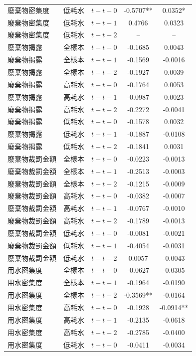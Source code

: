 \documentclass[12pt,a4paper]{article}
\begin{document}
\begin{table}[H]
\begin{threeparttable}
\begin{tabular}{llccc}
廢棄物密集度 & 低耗水 & $t-t-0$ & -0.5707** & 0.0352* \\
廢棄物密集度 & 低耗水 & $t-t-1$ & 0.4766 & 0.0323 \\
廢棄物密集度 & 低耗水 & $t-t-2$ & -- & -- \\
廢棄物揭露 & 全樣本 & $t-t-0$ & -0.1685 & 0.0043 \\
廢棄物揭露 & 全樣本 & $t-t-1$ & -0.1569 & -0.0016 \\
廢棄物揭露 & 全樣本 & $t-t-2$ & -0.1927 & 0.0039 \\
廢棄物揭露 & 高耗水 & $t-t-0$ & -0.1764 & 0.0053 \\
廢棄物揭露 & 高耗水 & $t-t-1$ & -0.0987 & 0.0023 \\
廢棄物揭露 & 高耗水 & $t-t-2$ & -0.2272 & -0.0041 \\
廢棄物揭露 & 低耗水 & $t-t-0$ & -0.1578 & 0.0032 \\
廢棄物揭露 & 低耗水 & $t-t-1$ & -0.1887 & -0.0108 \\
廢棄物揭露 & 低耗水 & $t-t-2$ & -0.1841 & 0.0031 \\
廢棄物裁罰金額 & 全樣本 & $t-t-0$ & -0.0223 & -0.0013 \\
廢棄物裁罰金額 & 全樣本 & $t-t-1$ & -0.2513 & -0.0003 \\
廢棄物裁罰金額 & 全樣本 & $t-t-2$ & -0.1215 & -0.0009 \\
廢棄物裁罰金額 & 高耗水 & $t-t-0$ & -0.0382 & -0.0007 \\
廢棄物裁罰金額 & 高耗水 & $t-t-1$ & -0.0767 & -0.0010 \\
廢棄物裁罰金額 & 高耗水 & $t-t-2$ & -0.1789 & -0.0013 \\
廢棄物裁罰金額 & 低耗水 & $t-t-0$ & -0.0081 & -0.0021 \\
廢棄物裁罰金額 & 低耗水 & $t-t-1$ & -0.4054 & -0.0031 \\
廢棄物裁罰金額 & 低耗水 & $t-t-2$ & 0.0057 & -0.0043 \\
用水密集度 & 全樣本 & $t-t-0$ & -0.0627 & -0.0305 \\
用水密集度 & 全樣本 & $t-t-1$ & -0.1964 & -0.0190 \\
用水密集度 & 全樣本 & $t-t-2$ & -0.3569** & -0.0164 \\
用水密集度 & 高耗水 & $t-t-0$ & -0.1928 & -0.0914** \\
用水密集度 & 高耗水 & $t-t-1$ & -0.2135 & -0.0618 \\
用水密集度 & 高耗水 & $t-t-2$ & -0.2785 & -0.0400 \\
用水密集度 & 低耗水 & $t-t-0$ & -0.0411 & -0.0034 \\

\end{tabular}
\end{threeparttable}
\end{table}
\end{document}
